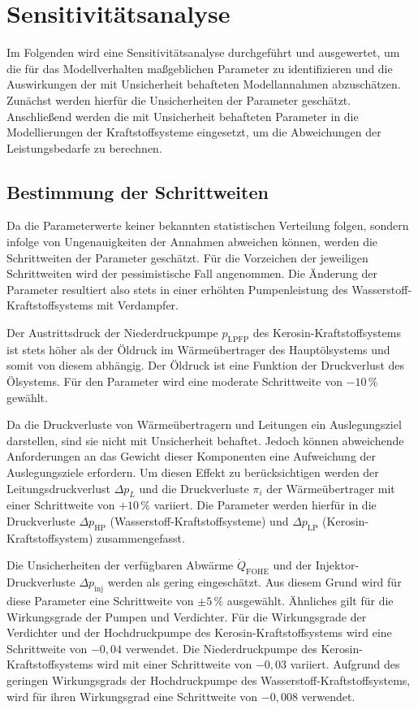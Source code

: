 \section{Sensitivitätsanalyse}

Im Folgenden wird eine Sensitivitätsanalyse durchgeführt und ausgewertet, um die für das Modellverhalten maßgeblichen Parameter zu identifizieren und die Auswirkungen der mit Unsicherheit behafteten Modellannahmen abzuschätzen. Zunächst werden hierfür die Unsicherheiten der Parameter geschätzt. Anschließend werden die mit Unsicherheit behafteten Parameter in die Modellierungen der Kraftstoffsysteme eingesetzt, um die Abweichungen der Leistungsbedarfe zu berechnen.

\subsection{Bestimmung der Schrittweiten}

Da die Parameterwerte keiner bekannten statistischen Verteilung folgen, sondern infolge von Ungenauigkeiten der Annahmen abweichen können, werden die Schrittweiten der Parameter geschätzt. Für die Vorzeichen der jeweiligen Schrittweiten wird der pessimistische Fall angenommen. Die Änderung der Parameter resultiert also stets in einer erhöhten Pumpenleistung des Wasserstoff-Kraftstoffsystems mit Verdampfer.

Der Austrittsdruck der Niederdruckpumpe $p_\mathrm{LPFP}$ des Kerosin-Kraftstoffsystems ist stets höher als der Öldruck im Wärmeübertrager des Hauptölsystems und somit von diesem abhängig. Der Öldruck ist eine Funktion der Druckverlust des Ölsystems. Für den Parameter wird eine moderate Schrittweite von $-10\,\%$ gewählt.

Da die Druckverluste von Wärmeübertragern und Leitungen ein Auslegungsziel darstellen, sind sie nicht mit Unsicherheit behaftet. Jedoch können abweichende Anforderungen an das Gewicht dieser Komponenten eine Aufweichung der Auslegungsziele erfordern. Um diesen Effekt zu berücksichtigen werden der Leitungsdruckverlust $\Delta p_L$ und die Druckverluste $\pi_i$ der Wärmeübertrager mit einer Schrittweite von $+10\,\%$ variiert. Die Parameter werden hierfür in die Druckverluste $\Delta p_\mathrm{HP}$ (Wasserstoff-Kraftstoffsysteme) und $\Delta p_\mathrm{LP}$ (Kerosin-Kraftstoffsystem) zusammengefasst.

Die Unsicherheiten der verfügbaren Abwärme $\dot{Q}_\mathrm{FOHE}$ und der Injektor-Druckverluste $\Delta p_\mathrm{inj}$ werden als gering eingeschätzt. Aus diesem Grund wird für diese Parameter eine Schrittweite von $\pm 5\,\%$ ausgewählt. Ähnliches gilt für die Wirkungsgrade der Pumpen und Verdichter. Für die Wirkungsgrade der Verdichter und der Hochdruckpumpe des Kerosin-Kraftstoffsystems wird eine Schrittweite von $-0,04$ verwendet. Die Niederdruckpumpe des Kerosin-Kraftstoffsystems wird mit einer Schrittweite von $-0,03$ variiert. Aufgrund des geringen Wirkungsgrads der Hochdruckpumpe des Wasserstoff-Kraftstoffsystems, wird für ihren Wirkungsgrad eine Schrittweite von $-0,008$ verwendet.

